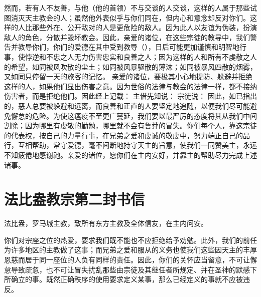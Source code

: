 然而，若有人不友善，与他（他的首领）不与交谈的人交谈，这样的人属于那些试图消灭天主教会的人；虽然他外表似乎与你们同在，但内心和意念却反对你们。这样的人比那些外在、公开敌对的人是更危险的敌人。因为此人以友谊为伪装，扮演敌人的角色，分散并毁坏教会。因此，亲爱的诸位，在这些宗徒的教导中，我们警告并教导你们，你们的爱德在其中受到教导（），日后可能更加谨慎和明智地行事，使悖逆和不忠之人无力伤害忠实和良善之人；因为这样的人和所有不虔敬之人的希望，如同被风吹散的尘土；如同被风暴驱散的薄沫；如同被暴风四散的烟雾，又如同只停留一天的旅客的记忆。 亲爱的诸位，要极其小心地提防、躲避并拒绝这样的人，如果他们显出伤害之意。因为世俗的法律与教会的法律一样，都不接纳伤害者，而是拒绝他们。因此经上记载：  主借先知说： 宗徒说：  因此，如已指出的，恶人总要被躲避和远离，而良善和正直的人要坚定地追随，以便我们尽可能避免懈怠的危险。为使这瘟疫不至更广蔓延，我们要以最严厉的态度将其从我们中间割除；因为哪里有虔敬的勤勉，哪里就不会有鲁莽的冒失。你们每个人，靠这宗徒的代表权，按自己的力量行事，在兄弟之爱和虔诚的敬虔中，努力端正自己的品行，互相帮助，常守爱德，毫不间断地持守天主的旨意，使我们一同赞美主，永远不知疲倦地感谢祂。亲爱的诸位，愿你们在主内安好，并靠主的帮助尽力完成上述诸事。\par


\section{法比盎教宗第二封书信}

\par

法比盎，罗马城主教，致所有东方主教及全体信友，在主内问安。\par

你们对宗座之位的热爱，要求我们既不能也不应拒绝给予劝勉。此外，我们的前任为许多地区的主教做了这事；而兄弟之爱和服从的义务也使我们这些因天主的丰厚恩慈而居于同一座位的人负有同样的责任。因此，你们的关怀应当留意，不可让懈怠导致疏忽，也不可让冒失扰乱那些由宗徒及其继任者所规定、并在圣神的默感下所确立的事。既然正确秩序的使用要求定义某事，那么已经定义的事就不应被违反。\par

